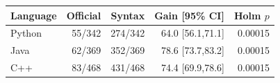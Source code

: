 \begin{tabular}{@{}lrrrr@{}}
\toprule
Language & Official & Syntax & Gain [95\% CI] & Holm $p$ \\
\midrule
Python & 55/342 & 274/342 & 64.0 [56.1,71.1] & 0.00015 \\
Java & 62/369 & 352/369 & 78.6 [73.7,83.2] & 0.00015 \\
C++ & 83/468 & 431/468 & 74.4 [69.9,78.6] & 0.00015 \\
\bottomrule
\end{tabular}
